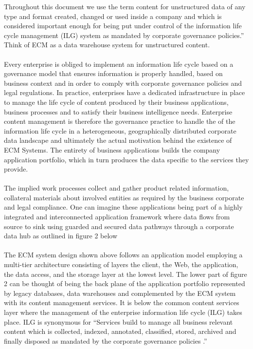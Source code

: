 \documentclass[EPiC]{easychair} %
\begin{document}
Throughout this document we use the term content for unstructured data of any type and format created, changed or used inside a company and which is considered important enough for being put under control of the information life cycle management (ILG) system as mandated by corporate governance policies.” Think of ECM as a data warehouse system for unstructured content.

\paragraph{}   Every enterprise is obliged to implement an information life cycle based on a governance model that ensures information is properly handled, based on business context and in order to comply with corporate governance policies and legal regulations. In practice, enterprises have a dedicated infrastructure in place to manage the life cycle of content produced by their business applications, business processes and to satisfy their business intelligence needs. Enterprise content management is therefore the governance practice to handle the of the information life cycle in a heterogeneous, geographically distributed corporate data landscape and ultimately the actual motivation behind the existence of ECM Systems. The entirety of business applications builds the company application portfolio, which in turn produces the data specific to the services they provide. 

\paragraph{} The implied work processes collect and gather product related information, collateral materials about involved entities as required by the business corporate and legal compliance. One can imagine these applications being part of a highly integrated and interconnected application framework where data flows from source to sink using guarded and secured data pathways through a corporate data hub as outlined in figure 2 below

\paragraph{} The ECM system design shown above follows an application model employing a multi-tier architecture consisting of layers the client, the Web, the application, the data access, and the storage layer at the lowest level. The lower part of figure 2 can be thought of being the back plane of the application portfolio represented by legacy databases, data warehouses and complemented by the ECM system with its content management services. It is below the common content services layer where the management of the enterprise information life cycle (ILG) takes place. ILG is synonymous for “Services build to manage all business relevant content which is collected, indexed, annotated, classified, stored, archived and finally disposed as mandated by the corporate governance policies	.”
\end{document}
